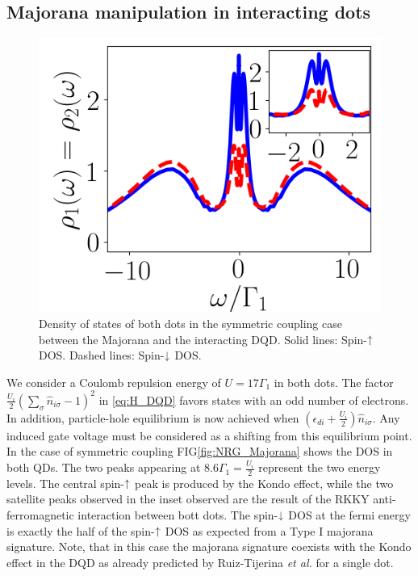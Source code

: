 \documentclass[showpacs,aps,prb,reprint,superscriptaddress]{revtex4-1}
\begin{document}
    \subsection{Majorana manipulation in interacting dots}
    
    \begin{figure}[t]
\begin{center}
\includegraphics[scale=0.48]{Graficos/NRG-t1=t2.png}
\caption{  \label{fig:NRG_Majorana} Density of states of both dots in the symmetric coupling case between the Majorana and the interacting DQD. Solid lines: Spin-$\uparrow$ DOS. Dashed lines: Spin-$\downarrow$ DOS. 
}
\label{fig:GenModel}
\end{center}
\end{figure}
    
    We consider a Coulomb repulsion energy of $U = 17\Gamma_1$ in both dots. The factor $ \frac{U_i}{2}(\sum_{\sigma} \hat{n}_{i\sigma}-1)^{2}$ in \eqref{eq:H_DQD} favors states with an odd number of electrons. In addition, particle-hole equilibrium is now achieved when $\left(\epsilon_{di}+\frac{U_i}{2}\right)\hat{n}_{i\sigma}$. Any induced gate voltage must be considered as a shifting from this equilibrium point. In the case of symmetric coupling FIG\ref{fig:NRG_Majorana} shows the DOS in both QDs. The two peaks appearing at $8.6\Gamma_1 = \frac{U_i}{2}$ represent the two energy levels. The central spin-$\uparrow$ peak is produced by the Kondo effect, \cite{hewson_kondo_1997,wilson_renormalization_1975}  while the two satellite peaks observed in the inset observed are the result of the  RKKY anti-ferromagnetic interaction between bott dots.  \cite{ruderman_indirect_1954,kasuya_theory_1956,yosida_magnetic_1957} The spin-$\downarrow$ DOS at the fermi energy  is exactly the half of the spin-$\uparrow$ DOS as expected from a Type I majorana signature. Note, that in this case the majorana signature coexists with the Kondo effect in the DQD as already predicted by Ruiz-Tijerina \textit{et al.} for a single dot. \cite{ruiz-tijerina_interaction_2015}
    
\end{document}
